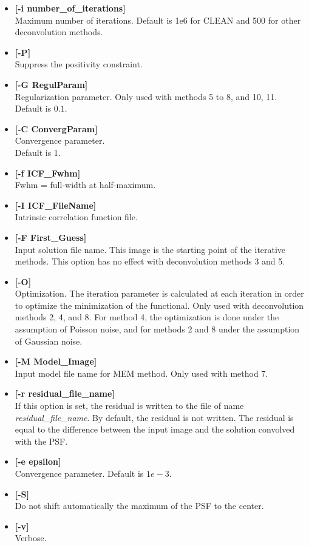 \begin{itemize}
\begin{itemize}
\begin{enumerate}
\item Deconvolution by the Gradient algorithm + Markov Random Field Regularization 
\item Deconvolution by Lucy's algorithm + Markov Random Field Regularization 
\end{enumerate}
Default is deconvolution by the gradient algorithm.
\item {\bf [-i number\_of\_iterations]} \\
Maximum number of iterations. Default is 1e6 for CLEAN and 500 for other
deconvolution methods.
\item {\bf [-P]} \\ 
 Suppress the positivity constraint.
\item {\bf [-G RegulParam]} \\
Regularization parameter. Only used with methods 5 to 8, and 10, 11.
Default is $0.1$.
\item {\bf [-C ConvergParam]} \\
Convergence parameter. \\ 
Default is 1.
\item {\bf [-f ICF\_Fwhm]} \\
Fwhm = full-width at half-maximum.  
\item {\bf [-I ICF\_FileName]} \\
Intrinsic correlation function file.
\item {\bf [-F First\_Guess]} \\
Input solution file name. This image is the starting point of the
iterative methods. This option has no effect with deconvolution methods
3 and 5.
\item {\bf [-O]} \\
Optimization. The iteration parameter is calculated at each iteration in
order to optimize the minimization of the functional. Only used with 
deconvolution methods 2, 4, and 8. For method 4, the optimization is done
under the assumption of Poisson noise, and for methods 2 and 8  
under the assumption of Gaussian noise.
\item {\bf [-M Model\_Image]} \\
Input model file name for MEM method. Only used with method 7.
\item {\bf [-r residual\_file\_name]} \\
If this option is set, the residual is written to 
the file of name {\em residual\_file\_name}. By default, the
residual is not written. The residual is equal to the difference between
the input image and the solution convolved with the PSF.
\item {\bf [-e epsilon]} \\
Convergence parameter. Default is $1e-3$.
\item {\bf [-S]} \\
Do not shift automatically the maximum of the PSF to the center.
\item {\bf [-v]} \\
Verbose.
\end{itemize}
\noindent

\end{itemize}

